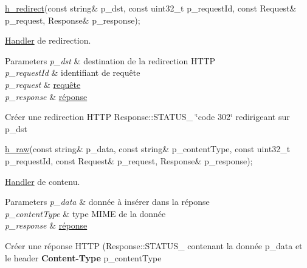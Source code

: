 \begin{DoxyItemize}
\item 
\begin{DoxyCode}
\hyperlink{classxtd_1_1network_1_1http_1_1Server_a7019a45601be34deed0a321a6be66cbf}{h\_redirect}(\textcolor{keyword}{const} \textcolor{keywordtype}{string}& p\_dst, \textcolor{keyword}{const} uint32\_t p\_requestId, \textcolor{keyword}{const} Request& p\_request, Response& 
      p\_response); 
\end{DoxyCode}
 \hyperlink{classxtd_1_1network_1_1http_1_1Server_1_1Handler}{Handler} de redirection. 
\begin{DoxyParams}{Parameters}
{\em p\-\_\-dst} & destination de la redirection H\-T\-T\-P \\
\hline
{\em p\-\_\-request\-Id} & identifiant de requête \\
\hline
{\em p\-\_\-request} & \hyperlink{classxtd_1_1network_1_1http_1_1Request}{requête} \\
\hline
{\em p\-\_\-response} & \hyperlink{classxtd_1_1network_1_1http_1_1Response}{réponse}\\
\hline
\end{DoxyParams}
Créer une redirection H\-T\-T\-P Response\-::\-S\-T\-A\-T\-U\-S\-\_ \char`\"{}code 302\char`\"{} redirigeant sur p\-\_\-dst
\item 
\begin{DoxyCode}
\hyperlink{classxtd_1_1network_1_1http_1_1Server_afa9cd0274280f47c74fe27ab4e2bfe38}{h\_raw}(\textcolor{keyword}{const} \textcolor{keywordtype}{string}& p\_data, \textcolor{keyword}{const} \textcolor{keywordtype}{string}& p\_contentType, \textcolor{keyword}{const} uint32\_t p\_requestId, \textcolor{keyword}{const} Request& 
      p\_request, Response& p\_response); 
\end{DoxyCode}
 \hyperlink{classxtd_1_1network_1_1http_1_1Server_1_1Handler}{Handler} de contenu. 
\begin{DoxyParams}{Parameters}
{\em p\-\_\-data} & donnée à insérer dans la réponse \\
\hline
{\em p\-\_\-content\-Type} & type M\-I\-M\-E de la donnée \\
\hline
{\em p\-\_\-response} & \hyperlink{classxtd_1_1network_1_1http_1_1Response}{réponse}\\
\hline
\end{DoxyParams}
Créer une réponse H\-T\-T\-P (Response\-::\-S\-T\-A\-T\-U\-S\-\_ contenant la donnée p\-\_\-data et le header {\bfseries Content-\/\-Type} p\-\_\-content\-Type
\item 

\end{DoxyItemize}

